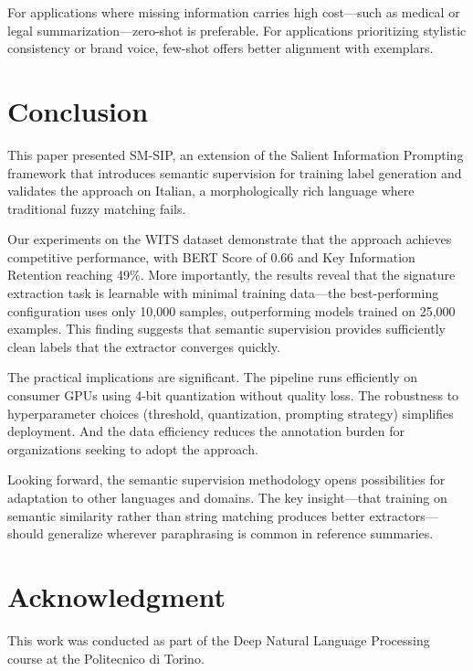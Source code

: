 \documentclass[conference]{IEEEtran}
\begin{document}
For applications where missing information carries high cost---such as medical or legal summarization---zero-shot is preferable. For applications prioritizing stylistic consistency or brand voice, few-shot offers better alignment with exemplars.

\section{Conclusion}

This paper presented SM-SIP, an extension of the Salient Information Prompting framework that introduces semantic supervision for training label generation and validates the approach on Italian, a morphologically rich language where traditional fuzzy matching fails.

Our experiments on the WITS dataset demonstrate that the approach achieves competitive performance, with BERT Score of 0.66 and Key Information Retention reaching 49\%. More importantly, the results reveal that the signature extraction task is learnable with minimal training data---the best-performing configuration uses only 10,000 samples, outperforming models trained on 25,000 examples. This finding suggests that semantic supervision provides sufficiently clean labels that the extractor converges quickly.

The practical implications are significant. The pipeline runs efficiently on consumer GPUs using 4-bit quantization without quality loss. The robustness to hyperparameter choices (threshold, quantization, prompting strategy) simplifies deployment. And the data efficiency reduces the annotation burden for organizations seeking to adopt the approach.

Looking forward, the semantic supervision methodology opens possibilities for adaptation to other languages and domains. The key insight---that training on semantic similarity rather than string matching produces better extractors---should generalize wherever paraphrasing is common in reference summaries.

\section*{Acknowledgment}

This work was conducted as part of the Deep Natural Language Processing course at the Politecnico di Torino.
\end{document}
